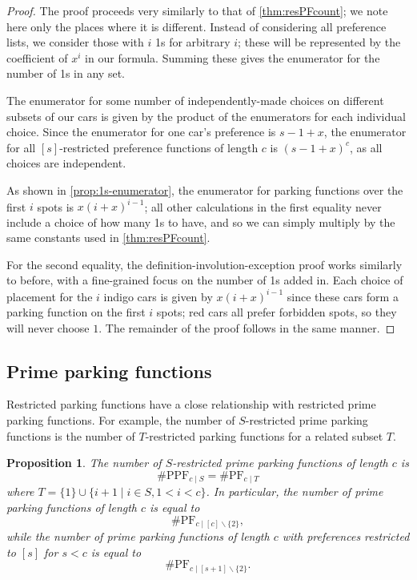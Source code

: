 \documentclass[12 pt]{amsart}
\newtheorem{proposition}[theorem]{Proposition}
\theoremstyle{definition} %
\theoremstyle{remark} %
\begin{document}
\begin{proof}
    The proof proceeds very similarly to that of \cref{thm:resPFcount}; we note here only the places where it is different. Instead of considering all preference lists, we consider those with $i$ 1s for arbitrary $i$; these will be represented by the coefficient of $x^i$ in our formula. Summing these gives the enumerator for the number of 1s in any set.

    The enumerator for some number of independently-made choices on different subsets of our cars is given by the product of the enumerators for each individual choice. Since the enumerator for one car's preference is $s-1+x$, the enumerator for all $[s]$-restricted preference functions of length $c$ is $(s-1+x)^c$, as all choices are independent.

    As shown in \cref{prop:1s-enumerator}, the enumerator for parking functions over the first $i$ spots is $x(i+x)^{i-1}$; all other calculations in the first equality never include a choice of how many 1s to have, and so we can simply multiply by the same constants used in \cref{thm:resPFcount}.

    For the second equality, the definition-involution-exception proof works similarly to before, with a fine-grained focus on the number of 1s added in. Each choice of placement for the $i$ indigo cars is given by $x(i+x)^{i-1}$ since these cars form a parking function on the first $i$ spots; red cars all prefer forbidden spots, so they will never choose $1$. The remainder of the proof follows in the same manner.
\end{proof}

\subsection{Prime parking functions}

Restricted parking functions have a close relationship with restricted prime parking functions. For example, the number of $S$-restricted prime parking functions is the number of $T$-restricted parking functions for a related subset $T$.

\begin{proposition}
\label{prop:primeRestrictedEquivalence}
    	The number of $S$-restricted prime parking functions of length $c$ is
	\[
    		\# \mathrm{PPF}_{c \mid S} = \# \mathrm{PF}_{c \mid T}
	\]
    	where $T= \{ 1 \} \cup \{ i + 1 \mid i \in S, 1 < i < c \}$.
	In particular, the number of prime parking functions of length $c$ is equal to
	\[
		\#\mathrm{PF}_{c\mid[c]\backslash\{2\}},
	\]
    while the number of prime parking functions of length $c$ with preferences restricted to $[s]$ for $s<c$ is equal to
	\[
		\#\mathrm{PF}_{c\mid[s+1]\backslash\{2\}}.
	\]
\end{proposition}
\end{document}
